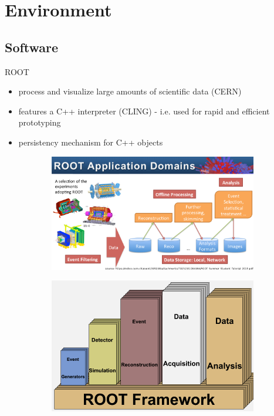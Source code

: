 \section{Environment}

\subsection{Software}
\begin{frame}{ROOT}
    \begin{itemize}
      \item process and visualize large amounts of scientific data (CERN)
      \item features a C++ interpreter (CLING) - i.e. used for rapid and efficient prototyping
      \item persistency mechanism for C++ objects
    \end{itemize}


  \begin{figure}[htb]
    \centering
    \begin{subfigure}[b]{0.5\textwidth}
      \includegraphics[width=0.97\linewidth, keepaspectratio]{./resources/root_application_domains.png}
      \nocite{cern:root:tut}
    \end{subfigure}%
    \begin{subfigure}[b]{0.5\textwidth}
      \includegraphics[width=0.97\linewidth, keepaspectratio]{./resources/root_application_domains2.png}
      \nocite{cern:root:domains}
    \end{subfigure}
  \end{figure}
\end{frame}

